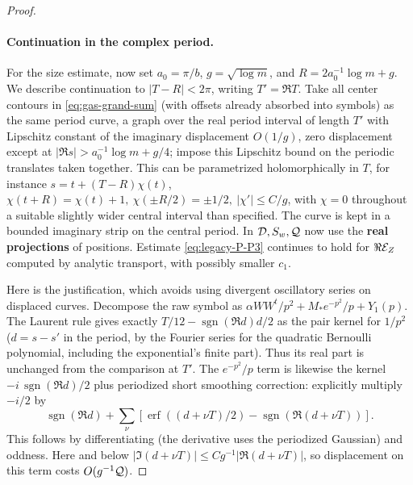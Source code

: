 \begin{proof}
\paragraph{Continuation in the complex period.}
For the size estimate, now set
\(a_0=\pi/b\), \(g=\sqrt{\log m}\), and
\(R=2a_0^{-1}\log m+g\). We describe continuation to
\(|T-R|<2\pi\), writing \(T'=\Re T\). Take all center contours in \eqref{eq:gas-grand-sum} (with offsets already absorbed into symbols) as the same period curve, a graph over the real period interval of length \(T'\) with Lipschitz constant of the imaginary displacement \(O(1/g)\), zero displacement except at \(|\Re s|>a_0^{-1}\log m+g/4\); impose this Lipschitz bound on the periodic translates taken together. This can be parametrized holomorphically in \(T\), for instance \(s=t+(T-R)\chi(t)\), \(\chi(t+R)=\chi(t)+1,\ \chi(\pm R/2)=\pm1/2,\ |\chi'|\le C/g\), with \(\chi=0\) throughout a suitable slightly wider central interval than specified. The curve is kept in a bounded imaginary strip on the central period. In \({\cal D},S_w,{\cal Q}\) now use the \textbf{real projections} of positions. Estimate \eqref{eq:legacy-P-P3} continues to hold for \(\Re{\cal E}_Z\) computed by analytic transport, with possibly smaller \(c_1\).

Here is the justification, which avoids using divergent oscillatory series on displaced curves. Decompose the raw symbol as \(\alpha WW^t/p^2+M_*e^{-p^2}/p+Y_1(p)\). The Laurent rule gives exactly \(T/12-\operatorname{sgn}(\Re d)d/2\) as the pair kernel for \(1/p^2\) (\(d=s-s'\) in the period, by the Fourier series for the quadratic Bernoulli polynomial, including the exponential's finite part). Thus its real part is unchanged from the comparison at \(T'\). The \(e^{-p^2}/p\) term is likewise the kernel \(-i\,\operatorname{sgn}(\Re d)/2\) plus periodized short smoothing correction: explicitly multiply \(-i/2\) by
\[
 \operatorname{sgn}(\Re d)+\sum_\nu
 [\operatorname{erf}((d+\nu T)/2)-\operatorname{sgn}(\Re(d+\nu T))].
\]
This follows by differentiating (the derivative uses the periodized Gaussian) and oddness. Here and below \(|\Im(d+\nu T)|\le Cg^{-1}|\Re(d+\nu T)|\), so displacement on this term costs \(O(g^{-1}{\cal Q})\).


\end{proof}
